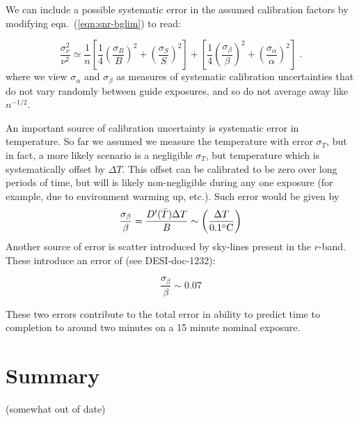\documentclass[11pt]{article}
\providecommand{\eqn}[1]{eqn.~(\ref{eqn:#1})}
\begin{document}
We can include a possible systematic error in the assumed calibration
factors by modifying \eqn{snr-bglim} to read:

\begin{equation}
\frac{\sigma_\nu^2}{\nu^2} \simeq \frac{1}{n}\left[
\frac{1}{4} \left(\frac{\sigma_B}{B}\right)^2 +
\left(\frac{\sigma_S}{S}\right)^2\right] + 
\left[
\frac{1}{4} \left(\frac{\sigma_\beta}{\beta}\right)^2 +
\left(\frac{\sigma_\alpha}{\alpha}\right)^2\right]
\; .
\label{eqn:calib_error}
\end{equation}
where we view $\sigma_\alpha$ and $\sigma_\beta$ as measures of systematic calibration uncertainties that do not vary randomly between guide exposures, and so do not average away like $n^{-1/2}$.

An important source of calibration uncertainty is systematic error in
temperature. So far we assumed we measure the temperature with error
$\sigma_T$, but in fact, a more likely scenario is a negligible
$\sigma_T$, but temperature which is systematically offset by $\Delta T$. This
offset can be calibrated to be zero over long periods of time, but
will is likely non-negligible during any one exposure (for example,
due to environment warming up, etc.). Such error would be given by
\begin{equation}
  \frac{\sigma_\beta}{\beta} = \frac{D'(\bar{T})\Delta T}{B} \sim
  \left(\frac{\Delta T}{0.1\degree {\rm C}} \right)
\end{equation}
Another source of error is scatter introduced by sky-lines present in
the $r$-band. These introduce an error of (see DESI-doc-1232):

\begin{equation}
  \frac{\sigma_\beta}{\beta} \sim 0.07 
\end{equation}

These two errors contribute to the total error in ability to predict
time to completion to around two minutes on a 15 minute nominal exposure. 


\section{Summary}

(somewhat out of date)
\end{document}

